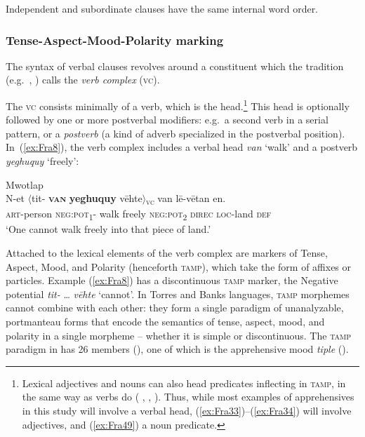 \documentclass[output=paper,colorlinks,citecolor=brown]{langscibook}
\begin{document}
\noindent Independent and subordinate clauses have the same internal word order.



\subsubsection{Tense-Aspect-Mood-Polarity marking}
\label{subsubsec:tampmarking}

 
The syntax of verbal clauses revolves around a constituent which the  tradition (e.g.\ \citealt{Durie1988}, \citealt{Evans2003}) calls the \textit{verb complex} (\textsc{vc}). 

The \textsc{vc} consists minimally of a verb, which is the head.\footnote{Lexical adjectives and nouns can also head predicates inflecting in \textsc{tamp}, in the same way as verbs do (\citeauthor{François2005a} \citeyear[131]{François2005a}, \citeyear[328]{François2017}, \citeyear{Françoisforthcomingb}). Thus, while most examples of apprehensives in this study will involve a verbal head, (\ref{ex:Fra33})--(\ref{ex:Fra34}) will involve adjectives, and (\ref{ex:Fra49}) a noun predicate.} This head is optionally followed by one or more postverbal modifiers: e.g.\ a second verb in a serial pattern, or a \textit{postverb} (a kind of adverb specialized in the postverbal position). In~(\ref{ex:Fra8}), the verb complex includes a verbal head \textit{van} `walk' and a postverb \textit{yeghuquy} `freely':
 
\ea \label{ex:Fra8} \textnormal{Mwotlap} \\
\gll N-et ${\langle}$tit- \textbf{\textsc{van}} \textbf{yeghuquy} vēhte${\rangle}$\textnormal{\textsc{\textsubscript{vc}}} van lē-vētan en. \\
\textsc{art}-person \textsc{neg:pot\textsubscript{1}}- walk freely \textsc{neg:pot\textsubscript{2}} \textsc{direc} \textsc{loc}-land \textsc{def} \\
\glt `One cannot walk freely into that piece of land.' 
\z

Attached to the lexical elements of the verb complex are markers of Tense, Aspect, Mood, and Polarity (henceforth \textsc{tamp}), which take the form of affixes or particles. Example (\ref{ex:Fra8}) has a discontinuous \textsc{tamp} marker, the Negative potential \textit{tit-} {\ldots} \textit{vēhte} `cannot'. In Torres and Banks languages, \textsc{tamp} morphemes cannot combine with each other: they form a single paradigm of unanalyzable, portmanteau forms that encode the semantics of tense, aspect, mood, and polarity in a single morpheme -- whether it is simple or discontinuous. The \textsc{tamp} paradigm in  has 26 members (\citealt[133]{François2005a}), one of which is the apprehensive mood \textit{tiple} ().
 
\end{document}
